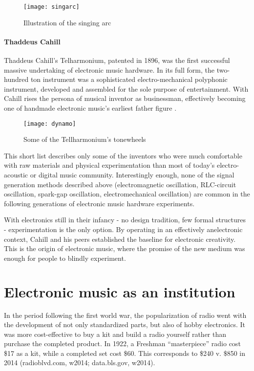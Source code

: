 	\begin{figure}[h!]
	  \caption{Illustration of the singing arc}
	  \centering
	    \texttt{[image: singarc]}
	\end{figure}

\paragraph{Thaddeus Cahill}

	Thaddeus Cahill’s Telharmonium, patented in 1896, was the first successful massive undertaking of electronic music hardware. In its full form, the two-hundred ton instrument was a sophisticated electro-mechanical polyphonic instrument, developed and assembled for the sole purpose of entertainment. With Cahill rises the persona of musical inventor as businessman, effectively becoming one of handmade electronic music’s earliest father figure \citep{holmes2002}. 
	
	\begin{figure}[h!]
	  \caption{Some of the Tellharmonium's tonewheels}
	  \centering
	    \texttt{[image: dynamo]}
	\end{figure}

	This short list describes only some of the inventors who were much comfortable with raw materials and physical experimentation than most of today’s electro-acoustic or digital music community. Interestingly enough, none of the signal generation methods described above (electromagnetic oscillation, RLC-circuit oscillation, spark-gap oscillation, electromechanical oscillation) are common in the following generations of electronic music hardware experiments. 

	With electronics still in their infancy - no design tradition, few formal structures -  experimentation is the only option. By operating in an effectively anelectronic context, Cahill and his peers established the baseline for electronic creativity. This is the origin of electronic music, where the promise of the new medium was enough for people to blindly experiment. 

\section{Electronic music as an institution}

In the period following the first world war, the popularization of radio went with the development of not only standardized parts, but also of hobby electronics. It was more cost-effective to buy a kit and build a radio yourself rather than purchase the completed product. In 1922, a Freshman “masterpiece” radio cost \$17 as a kit, while a completed set cost \$60. This corresponds to \$240 v. \$850 in 2014 (radioblvd.com, w2014; data.bls.gov, w2014). 

